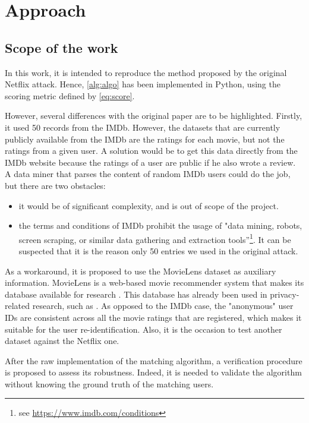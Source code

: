 \section{Approach}\label{sec:approach}

\subsection{Scope of the work}

In this work, it is intended to reproduce the method proposed by the original Netflix attack. Hence, \autoref{alg:algo} has been implemented in Python, using the scoring metric defined by \autoref{eq:score}.

However, several differences with the original paper are to be highlighted. Firstly, it used 50 records from the IMDb. However, the datasets that are currently publicly available from the IMDb are the ratings for each movie, but not the ratings from a given user. A solution would be to get this data directly from the IMDb website because the ratings of a user are public if he also wrote a review. A data miner that parses the content of random IMDb users could do the job, but there are two obstacles:

\begin{itemize}
	\item it would be of significant complexity, and is out of scope of the project.
	\item the terms and conditions of IMDb prohibit the usage of "data mining, robots, screen scraping, or similar data gathering and extraction tools”\footnote{see \url{https://www.imdb.com/conditions}}. It can be suspected that it is the reason only 50 entries we used in the original attack. 
\end{itemize}

As a workaround, it is proposed to use the MovieLens dataset as auxiliary information. MovieLens is a web-based movie recommender system that makes its database available for research \cite{movielens-db}. This database has already been used in privacy-related research, such as \cite{movielens}. As opposed to the IMDb case, the "anonymous" user IDs are consistent across all the movie ratings that are registered, which makes it suitable for the user re-identification. Also, it is the occasion to test another dataset against the Netflix one.

After the raw implementation of the matching algorithm, a verification procedure is proposed to assess its robustness. Indeed, it is needed to validate the algorithm without knowing the ground truth of the matching users.  


